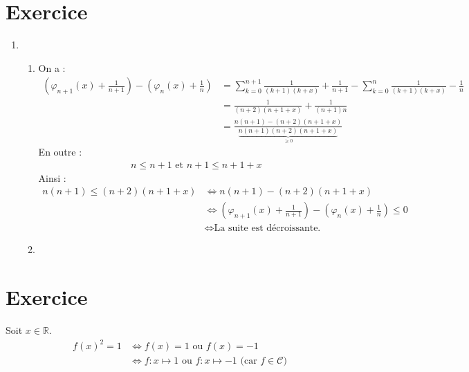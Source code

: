 \documentclass{report}
\begin{document}
\section{Exercice}
\begin{enumerate}
    \item \begin{enumerate}
        \item On a :
        \begin{align*}
            \left( \varphi_{n+1}(x) + \frac{1}{n+1} \right) - \left( \varphi_n (x) + \frac{1}{n} \right) &= \sum_{k=0}^{n+1} \frac{1}{(k+1)(k+x)} + \frac{1}{n+1} - \sum_{k=0}^{n} \frac{1}{(k+1)(k+x)} - \frac{1}{n} \\
            &= \frac{1}{(n+2)(n+1+x)} + \frac{1}{(n+1)n} \\
            &= \frac{n(n+1) - (n+2)(n+1+x)}{\underbrace{n(n+1)(n+2)(n+1+x)}_{\geq 0}}
        \end{align*}
        En outre : 
        \begin{align*}
            n \leq n+1 \text{ et } n+1 \leq n+1+x
        \end{align*}
        Ainsi : 
        \begin{align*}
            n(n+1) \leq (n+2)(n+1+x) &\Leftrightarrow n(n+1) - (n+2)(n+1+x) \\
            &\Leftrightarrow \left( \varphi_{n+1}(x) + \frac{1}{n+1} \right) - \left( \varphi_n (x) + \frac{1}{n} \right) \leq 0 \\
            &\Leftrightarrow \text{La suite est décroissante. }
        \end{align*}

        \item 
    \end{enumerate}
\end{enumerate}

\setcounter{section}{9}
\section{Exercice}
Soit $x \in \mathbb{R}$. 
\begin{align*}
    f(x)^2 = 1 &\Leftrightarrow f(x) = 1 \text{ ou } f(x) = -1 \\
    &\Leftrightarrow f:x\mapsto 1 \text{ ou } f:x\mapsto -1 \text{ (car $f\in \mathcal{C}$)}
\end{align*}
\end{document}
